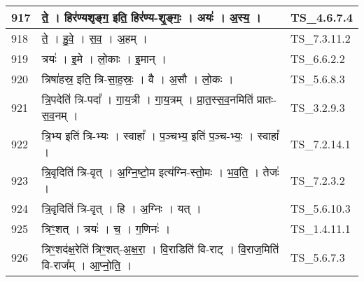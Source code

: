 \documentclass[17pt]{extarticle}
\begin{document}
\begin{longtable}{||p{0.4in}||p{4.9in}||p{0.9in}||}
    \hline
        
    917 & ते॒   ।   हिर॑ण्यशृङ्ग॒ इति॒ हिर॑ण्य{-}शृ॒ङ्गः॒   ।   अयः॑   ।   अ॒स्य॒   ।    & TS\_4.6.7.4       \\
    
    \hline
        
    918 & ते॒   ।   हु॒वे॒   ।   स॒व॒   ।   अ॒हम्   ।    & TS\_7.3.11.2       \\
    
    \hline
        
    919 & त्रयः॑   ।   इ॒मे   ।   लो॒काः   ।   इ॒मान्   ।    & TS\_6.6.2.2       \\
    
    \hline
        
    920 & त्रिषा॑हस्र॒ इति॒ त्रि{-}सा॒ह॒स्रः॒   ।   वै   ।   अ॒सौ   ।   लो॒कः   ।    & TS\_5.6.8.3       \\
    
    \hline
        
    921 & त्रि॒पदेति॑ त्रि{-}पदा᳚   ।   गा॒य॒त्री   ।   गा॒य॒त्रम्   ।   प्रा॒त॒स्स॒व॒नमिति॑ प्रातः{-}स॒व॒नम्   ।    & TS\_3.2.9.3       \\
    
    \hline
        
    922 & त्रि॒भ्य इति॑ त्रि{-}भ्यः   ।   स्वाहा᳚   ।   प॒ञ्चभ्य॒ इति॑ प॒ञ्च{-}भ्यः॒   ।   स्वाहा᳚   ।    & TS\_7.2.14.1       \\
    
    \hline
        
    923 & त्रि॒वृदिति॑ त्रि{-}वृत्   ।   अ॒ग्नि॒ष्टो॒म इत्य॑ग्नि{-}स्तो॒मः   ।   भ॒व॒ति॒   ।   तेजः॑   ।    & TS\_7.2.3.2       \\
    
    \hline
        
    924 & त्रि॒वृदिति॑ त्रि{-}वृत्   ।   हि   ।   अ॒ग्निः   ।   यत्   ।    & TS\_5.6.10.3       \\
    
    \hline
        
    925 & त्रिꣳ॒॒शत्   ।   त्रयः॑   ।   च॒   ।   ग॒णिनः॑   ।    & TS\_1.4.11.1       \\
    
    \hline
        
    926 & त्रिꣳ॒॒शद॑क्ष॒रेति॑ त्रिꣳ॒॒शत्{-}अ॒क्ष॒रा॒   ।   वि॒राडिति॑ वि{-}राट्   ।   वि॒राज॒मिति॑ वि{-}राज᳚म्   ।   आ॒प्नो॒ति॒   ।    & TS\_5.6.7.3       \\
    
    \hline
        

\end{longtable}
\end{document}
